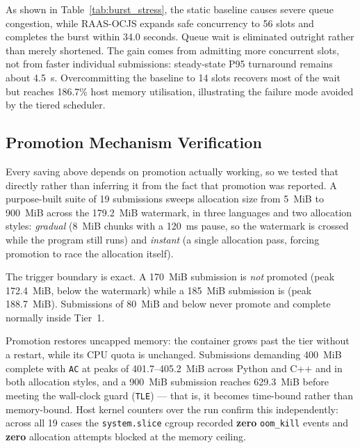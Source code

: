 \documentclass[conference]{IEEEtran}
\begin{document}
As shown in Table~\ref{tab:burst_stress}, the static baseline causes severe queue congestion, while RAAS-OCJS expands safe concurrency to 56 slots and completes the burst within 34.0 seconds. Queue wait is eliminated outright rather than merely shortened. The gain comes from admitting more concurrent slots, not from faster individual submissions: steady-state P95 turnaround remains about 4.5~s. Overcommitting the baseline to 14 slots recovers most of the wait but reaches 186.7\% host memory utilisation, illustrating the failure mode avoided by the tiered scheduler.

\subsection{Promotion Mechanism Verification}
\label{sec:promotion_verify}
Every saving above depends on promotion actually working, so we tested that directly rather than inferring it from the fact that promotion was reported. A purpose-built suite of 19 submissions sweeps allocation size from 5~MiB to 900~MiB across the 179.2~MiB watermark, in three languages and two allocation styles: \emph{gradual} (8~MiB chunks with a 120~ms pause, so the watermark is crossed while the program still runs) and \emph{instant} (a single allocation pass, forcing promotion to race the allocation itself).

The trigger boundary is exact. A 170~MiB submission is \emph{not} promoted (peak 172.4~MiB, below the watermark) while a 185~MiB submission is (peak 188.7~MiB). Submissions of 80~MiB and below never promote and complete normally inside Tier~1.

Promotion restores uncapped memory: the container grows past the tier without a restart, while its CPU quota is unchanged. Submissions demanding 400~MiB complete with \texttt{AC} at peaks of 401.7--405.2~MiB across Python and C++ and in both allocation styles, and a 900~MiB submission reaches 629.3~MiB before meeting the wall-clock guard (\texttt{TLE}) --- that is, it becomes time-bound rather than memory-bound. Host kernel counters over the run confirm this independently: across all 19 cases the \texttt{system.slice} cgroup recorded \textbf{zero} \texttt{oom\_kill} events and \textbf{zero} allocation attempts blocked at the memory ceiling.
\end{document}
